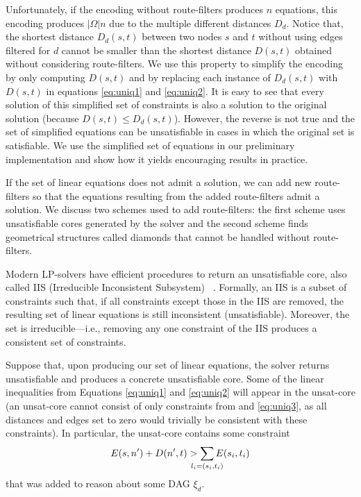 Unfortunately, if the encoding without route-filters produces $n$ equations, this encoding produces $|\Omega|n$ due
to the multiple different distances $D_d$.
Notice that, the shortest distance $D_d(s,t)$ between two nodes $s$ and $t$ without using edges filtered for $d$ cannot be
smaller than the shortest distance $D(s,t)$ obtained without considering route-filters.
We use this property to simplify the encoding by only computing $D(s,t)$ and by replacing each instance of $D_d(s,t)$
with $D(s,t)$ in
equations \eqref{eq:uniq1} and \eqref{eq:uniq2}. 
It is easy to see that every solution of this simplified set of constraints
is also a solution to the original solution (because $D(s,t)\leq D_d(s,t)$).
However, the reverse is not true and the set of simplified equations can be unsatisfiable
in cases in which the original set is satisfiable.
We use the simplified
set of equations in our preliminary implementation and show how it yields encouraging results in practice.

If the set of linear equations does not admit a solution, we 
can add new route-filters so that the equations resulting from the added
route-filters admit a solution.
We discuss two schemes used to add route-filters:
the first scheme uses unsatisfiable cores generated
by the solver and the second scheme 
finds geometrical structures called diamonds that 
cannot be handled without route-filters.



Modern LP-solvers have efficient procedures to return an
unsatisfiable core, also called IIS (Irreducible Inconsistent Subsystem)
~\cite{chinneck2007feasibility}. Formally, an IIS is a subset of constraints such that,
if all constraints except those in the IIS are removed, the resulting set of
linear equations is still inconsistent (unsatisfiable). Moreover, the set is irreducible---i.e., removing 
any one constraint of the IIS produces a consistent set of constraints. 

Suppose that, upon producing our set of linear equations, the solver returns unsatisfiable and produces
a concrete unsatisfiable core. 
Some of the linear inequalities from 
Equations \eqref{eq:uniq1} and  \eqref{eq:uniq2}
will appear in the unsat-core 
(an unsat-core cannot consist of only 
constraints from  and \eqref{eq:uniq3}, as all distances and edges set to zero
would trivially be consistent with these constraints). 
In particular, the unsat-core contains some constraint
\begin{eqnarray}
E(s, n') + D(n', t) > \sum_{\mathclap{\substack{l_i=(s_i,t_i)}}} 
		E(s_i, t_i) 
\end{eqnarray}
that was added to reason about some DAG $\xi_d$.


